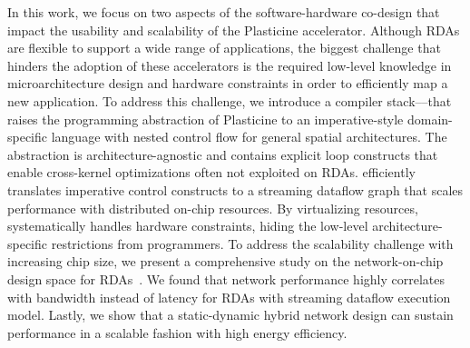 In this work, we focus on two aspects of the software-hardware co-design that impact the usability
and scalability of the Plasticine accelerator.
Although RDAs are flexible to support a wide range of applications, 
the biggest challenge that hinders the adoption of these accelerators is 
the required low-level knowledge in microarchitecture design and hardware constraints in
order to efficiently map a new application.
To address this challenge, we introduce a compiler stack--\name--that raises the programming abstraction of
Plasticine to an imperative-style domain-specific language with nested control
flow for general spatial architectures.
The abstraction is architecture-agnostic and contains explicit loop constructs that enable
cross-kernel optimizations often not exploited on RDAs.
\name efficiently translates imperative control constructs to a streaming
dataflow graph that scales performance with distributed on-chip resources.
By virtualizing resources, \name systematically handles hardware constraints, hiding
the low-level architecture-specific restrictions from programmers.
To address the scalability challenge with increasing chip size,
we present a comprehensive study on the network-on-chip design space for RDAs~\cite{network}.
We found that network performance highly correlates with bandwidth instead of latency
for RDAs with streaming dataflow execution model.
Lastly, we show that a static-dynamic hybrid network design can sustain performance in a
scalable fashion with high energy efficiency.
